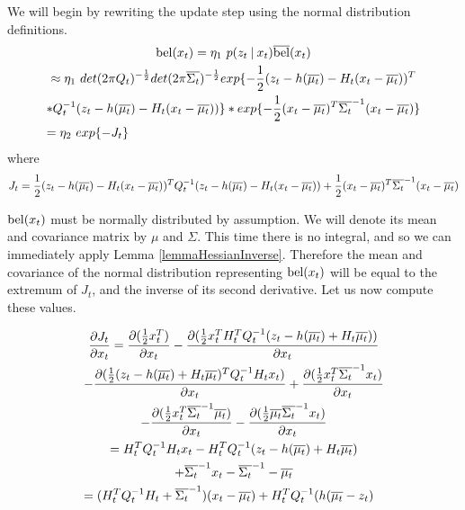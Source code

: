 We will begin by rewriting the update step using the normal distribution definitions.
\begin{multline*}
\bel(x_t) = \eta_1\ p(z_t \mathbin{\vert} x_t) \overline{\bel}(x_t) \\
\approx \eta_1\ det(2 \pi Q_t)^{-\frac{1}{2}} det(2 \pi \overline{\Sigma_t})^{-\frac{1}{2}} exp\{-\frac{1}{2} (z_t - h(\overline{\mu_t}) - H_t (x_t - \overline{\mu_t}))^T \\ * Q_t^{-1} (z_t - h(\overline{\mu_t}) - H_t (x_t - \overline{\mu_t}))\} * exp \{-\frac{1}{2} (x_t - \overline{\mu_t})^T \overline{\Sigma_t}^{-1} (x_t - \overline{\mu_t}) \} \\
= \eta_2\ exp\{-J_t\} \hfill
\end{multline*} where \[
J_t = \frac{1}{2} (z_t - h(\overline{\mu_t}) - H_t (x_t - \overline{\mu_t}))^T Q_t^{-1} (z_t - h(\overline{\mu_t}) - H_t (x_t - \overline{\mu_t})) \\
+ \frac{1}{2} (x_t - \overline{\mu_t})^T \overline{\Sigma_t}^{-1} (x_t - \overline{\mu_t})
\]

\(\mathrm{bel}(x_t)\) must be normally distributed by assumption. We will denote its mean and covariance matrix by \(\mu\) and \(\Sigma\). This time there is no integral, and so we can immediately apply Lemma \ref{lemmaHessianInverse}. 
Therefore the mean and covariance of the normal distribution representing \(\mathrm{bel}(x_t)\) will be equal to the extremum of \(J_t\), and the inverse of its second derivative. Let us now compute these values.

\begin{multline*}
\frac{\partial J_t}{\partial x_t} = \frac{\partial (\frac{1}{2} x_t^T )}{\partial x_t} - \frac{\partial (\frac{1}{2} x_t^T H_t^T Q_t^{-1} (z_t - h(\overline{\mu_t}) + H_t \overline{\mu_t}))}{\partial x_t} \\
- \frac{\partial (\frac{1}{2} (z_t - h(\overline{\mu_t}) + H_t \overline{\mu_t})^T Q_t^{-1} H_t x_t)}{\partial x_t} + \frac{\partial (\frac{1}{2} x_t^T \overline{\Sigma_t}^{-1} x_t)}{\partial x_t} \\
- \frac{\partial (\frac{1}{2} x_t^T \overline{\Sigma_t}^{-1} \overline{\mu_t})}{\partial x_t} - \frac{\partial (\frac{1}{2} \overline{\mu_t} \overline{\Sigma_t}^{-1} x_t )}{\partial x_t} \\
= H_t^T Q_t^{-1} H_t x_t - H_t^T Q_t^{-1} (z_t - h(\overline{\mu_t}) + H_t \overline{\mu_t}) \\
+ \overline{\Sigma_t}^{-1} x_t - \overline{\Sigma_t}^{-1} - \overline{\mu_t} \\
= (H_t^T Q_t^{-1} H_t + \overline{\Sigma_t}^{-1}) (x_t - \overline{\mu_t}) + H_t^TQ_t^{-1}(h(\overline{\mu_t} - z_t) \hfill
\end{multline*}

